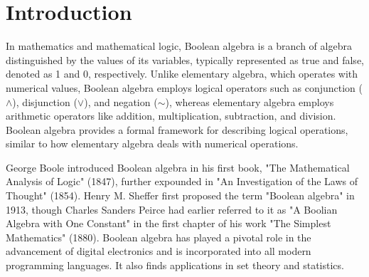 \chapter*{Introduction}
{
In mathematics and mathematical logic, Boolean algebra is a branch of algebra distinguished by the values of its variables, typically represented as true and false, denoted as 1 and 0, respectively. Unlike elementary algebra, which operates with numerical values, Boolean algebra employs logical operators such as conjunction ($\wedge$), disjunction ($\vee$), and negation ($\sim$), whereas elementary algebra employs arithmetic operators like addition, multiplication, subtraction, and division. Boolean algebra provides a formal framework for describing logical operations, similar to how elementary algebra deals with numerical operations.

George Boole introduced Boolean algebra in his first book, "The Mathematical Analysis of Logic" (1847), further expounded in "An Investigation of the Laws of Thought" (1854). Henry M. Sheffer first proposed the term "Boolean algebra" in 1913, though Charles Sanders Peirce had earlier referred to it as "A Boolian Algebra with One Constant" in the first chapter of his work "The Simplest Mathematics" (1880). Boolean algebra has played a pivotal role in the advancement of digital electronics and is incorporated into all modern programming languages. It also finds applications in set theory and statistics.}
